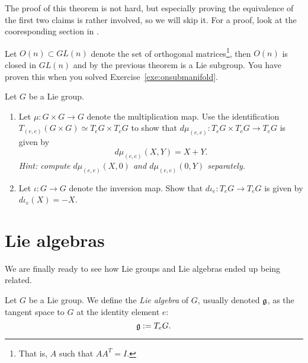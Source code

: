 The proof of this theorem is not hard, but especially proving the equivalence of the first two claims is rather involved, so we will skip it.
For a proof, look at the cooresponding section in \cite[Chapter 20]{book:lee}.

\begin{example}
  Let $O(n)\subset GL(n)$ denote the set of orthogonal matrices\footnote{That is, $A$ such that $AA^T = I$.}, then $O(n)$ is closed in $GL(n)$ and by the previous theorem is a Lie subgroup.
  You have proven this when you solved Exercise~\ref{exe:onsubmanifold}.
\end{example}

\begin{exercise}\label{ex:DiffGroupMaps}
  Let $G$ be a Lie group.
  \begin{enumerate}
    \item Let $\mu:G\times G\to G$ denote the multiplication map.
    Use the identification $T_{(e,e)}(G\times G) \simeq T_eG\times T_eG$ to show that $d\mu_{(e,e)}:T_eG\times T_eG\to T_eG$ is given by
    \begin{equation}
      d\mu_{(e,e)}(X,Y) = X + Y.
    \end{equation}
    \textit{\small Hint: compute $d\mu_{(e,e)}(X,0)$ and $d\mu_{(e,e)}(0,Y)$ separately.}
    \item Let $\iota: G\to G$ denote the inversion map. Show that $d\iota_e:T_eG\to T_eG$ is given by $d\iota_e(X) = -X$.
  \end{enumerate}
\end{exercise}

\section{Lie algebras}

We are finally ready to see how Lie groups and Lie algebras ended up being related.

\begin{definition}
  Let $G$ be a Lie group.
  We define the \emph{Lie algebra} of $G$, usually denoted $\mathfrak{g}$, as the tangent space to $G$ at the identity element $e$:
  \begin{equation}
    \mathfrak{g} := T_e G.
  \end{equation}
\end{definition}

